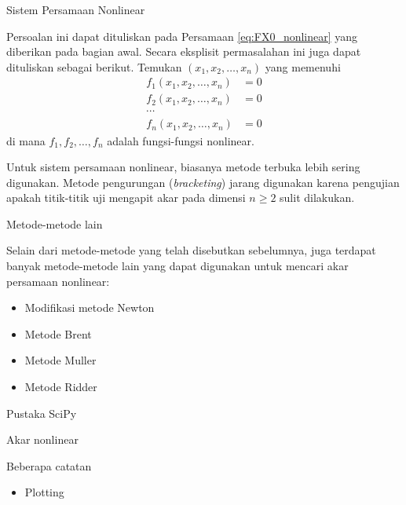\begin{frame}{Sistem Persamaan Nonlinear}
\fontsize{9}{10}\selectfont

Persoalan ini dapat dituliskan pada Persamaan \eqref{eq:FX0_nonlinear}
yang diberikan pada bagian awal.
Secara eksplisit permasalahan ini juga dapat dituliskan sebagai berikut.
Temukan $(x_1, x_2, \ldots, x_n)$ yang memenuhi
\begin{align*}
f_{1} (x_1, x_2, \ldots, x_n) & = 0 \\
f_{2} (x_1, x_2, \ldots, x_n) & = 0 \\
\cdots \\
f_{n} (x_1, x_2, \ldots, x_n) & = 0
\end{align*}
di mana $f_{1}, f_{2}, \ldots, f_{n}$ adalah fungsi-fungsi nonlinear.

Untuk sistem persamaan nonlinear, biasanya metode terbuka lebih sering
digunakan. Metode pengurungan (\textit{bracketing}) jarang digunakan karena
pengujian apakah titik-titik uji mengapit akar
pada dimensi $n \geq 2$ sulit dilakukan.

\end{frame}


\begin{frame}{Metode-metode lain}

Selain dari metode-metode yang telah disebutkan sebelumnya, juga
terdapat banyak metode-metode lain yang dapat digunakan untuk mencari
akar persamaan nonlinear:
\begin{itemize}\tightlist
\item Modifikasi metode Newton
\item Metode Brent
\item Metode Muller
\item Metode Ridder
\end{itemize}

\end{frame}


\begin{frame}{Pustaka SciPy}

Akar nonlinear

\end{frame}



\begin{frame}{Beberapa catatan}
\begin{itemize}
\item Plotting
\end{itemize}
\end{frame}